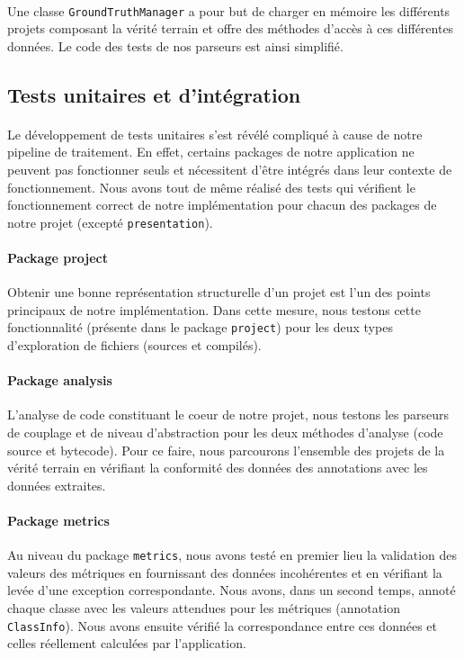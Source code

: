 \documentclass{scrartcl}
\begin{document}
    \paragraph{}Une classe \texttt{GroundTruthManager} a pour but de charger en mémoire les différents projets composant la vérité terrain et offre des méthodes d'accès à ces différentes données. Le code des tests de nos parseurs est ainsi simplifié.

\subsection{Tests unitaires et d'intégration}

    \paragraph{}Le développement de tests unitaires s'est révélé compliqué à cause de notre pipeline de traitement. En effet, certains packages de notre application ne peuvent pas fonctionner seuls et nécessitent d'être intégrés dans leur contexte de fonctionnement. Nous avons tout de même réalisé des tests qui vérifient le fonctionnement correct de notre implémentation pour chacun des packages de notre projet (excepté \texttt{presentation}).
    
    \paragraph{Package project}Obtenir une bonne représentation structurelle d'un projet est l'un des points principaux de notre implémentation. Dans cette mesure, nous testons cette fonctionnalité (présente dans le package \texttt{project}) pour les deux types d'exploration de fichiers (sources et compilés).
    
    \paragraph{Package analysis}L'analyse de code constituant le coeur de notre projet, nous testons les parseurs de couplage et de niveau d'abstraction pour les deux méthodes d'analyse (code source et bytecode). Pour ce faire, nous parcourons l'ensemble des projets de la vérité terrain en vérifiant la conformité des données des annotations avec les données extraites. 
    
    \paragraph{Package metrics}Au niveau du package \texttt{metrics}, nous avons testé en premier lieu la validation des valeurs des métriques en fournissant des données incohérentes et en vérifiant la levée d'une exception correspondante. Nous avons, dans un second temps, annoté chaque classe avec les valeurs attendues pour les métriques (annotation \texttt{ClassInfo}). Nous avons ensuite vérifié la correspondance entre ces données et celles réellement calculées par l'application.
    
\end{document}
